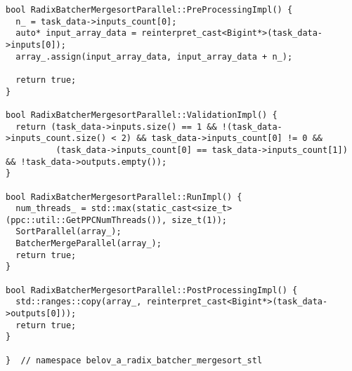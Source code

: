 \documentclass[a4paper,12pt]{article}
\begin{document}
\begin{lstlisting}
bool RadixBatcherMergesortParallel::PreProcessingImpl() {
  n_ = task_data->inputs_count[0];
  auto* input_array_data = reinterpret_cast<Bigint*>(task_data->inputs[0]);
  array_.assign(input_array_data, input_array_data + n_);

  return true;
}

bool RadixBatcherMergesortParallel::ValidationImpl() {
  return (task_data->inputs.size() == 1 && !(task_data->inputs_count.size() < 2) && task_data->inputs_count[0] != 0 &&
          (task_data->inputs_count[0] == task_data->inputs_count[1]) && !task_data->outputs.empty());
}

bool RadixBatcherMergesortParallel::RunImpl() {
  num_threads_ = std::max(static_cast<size_t>(ppc::util::GetPPCNumThreads()), size_t(1));
  SortParallel(array_);
  BatcherMergeParallel(array_);
  return true;
}

bool RadixBatcherMergesortParallel::PostProcessingImpl() {
  std::ranges::copy(array_, reinterpret_cast<Bigint*>(task_data->outputs[0]));
  return true;
}

}  // namespace belov_a_radix_batcher_mergesort_stl
\end{lstlisting}
\end{document}

